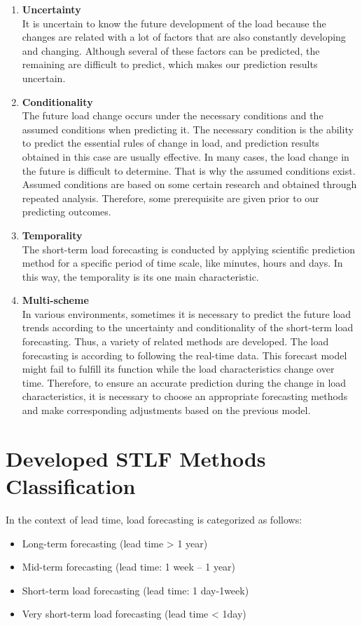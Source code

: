 \begin{enumerate}
    \item \textbf{Uncertainty}\\
    It is uncertain to know the future development of the load because the changes are related with a lot of factors that are also constantly developing and changing. Although several of these factors can be predicted, the remaining are difficult to predict, which makes our prediction results uncertain.
    \item  \textbf{Conditionality}\\
    The future load change occurs under the necessary conditions and the assumed conditions when predicting it. The necessary condition is the ability to predict the essential rules of change in load, and prediction results obtained in this case are usually effective. In many cases, the load change in the future is difficult to determine. That is why the assumed conditions exist. Assumed conditions are based on some certain research and obtained through repeated analysis. Therefore, some prerequisite are given prior to our predicting outcomes.
    \item \textbf{Temporality}\\
    The short-term load forecasting is conducted by applying scientific prediction method for a specific period of time scale, like minutes, hours and days. In this way, the temporality is its one main characteristic.
\item \textbf{Multi-scheme}\\
In various environments, sometimes it is necessary to predict the future load trends according to the uncertainty and conditionality of the short-term load forecasting. Thus, a variety of related methods are developed. The load forecasting is according to following the real-time data. This forecast model might fail to fulfill its function while the load characteristics change over time. Therefore, to ensure an accurate prediction during the change in load characteristics, it is necessary to choose an appropriate forecasting methods and make corresponding adjustments based on the previous model.
\end{enumerate}
\section{Developed STLF Methods Classification}
In the context of lead time, load forecasting is categorized as follows:
\begin{itemize}
    \item Long-term forecasting (lead time > 1 year)
    \item Mid-term forecasting (lead time: 1 week – 1 year)
    \item Short-term load forecasting (lead time: 1 day-1week)
    \item Very short-term load forecasting (lead time < 1day) 
\end{itemize}

